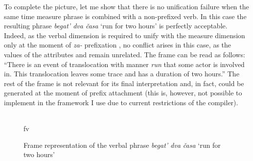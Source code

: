 To complete the picture, let me show that there is no unification failure when the same time measure phrase  is combined with a non-prefixed verb. In this case the resulting phrase \textit{begat' dva \v{c}asa} `run for two hours' is perfectly acceptable. Indeed, as the verbal dimension is required to unify with the measure dimension only at the moment of \textit{za-}  prefixation , no conflict arises in this case, as the values of the attributes {\scshape\MDIM} and {\scshape\VERBDIM} remain unrelated. The frame can be read as follows: ``There is an event of translocation  with manner \textit{run} that some actor is involved in. This translocation  leaves some trace and has a duration of two hours.'' The rest of the frame is not relevant for its final interpretation and, in fact, could be generated at the moment of prefix attachment (this is, however, not possible to implement in the framework I use due to current restrictions of the compiler).

\begin{figure}
\centering
{}\\fv
\caption{Frame representation of the verbal phrase \textit{begat' dva \v{c}asa} `run for two hours' \label{frame:begat:2hours}}
\end{figure}

